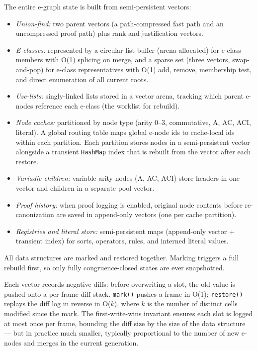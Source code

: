 \documentclass[sigplan,nonacm]{acmart}
\begin{document}
The entire e-graph state is built from semi-persistent vectors:
\begin{itemize}
\item \emph{Union-find:} two parent vectors (a path-compressed fast
  path and an uncompressed proof path) plus rank and justification
  vectors.
\item \emph{E-classes:} represented by a circular list buffer
  (arena-allocated) for e-class members with O(1) splicing on merge,
  and a sparse set (three vectors, swap-and-pop) for e-class
  representatives with O(1) add, remove, membership test, and direct
  enumeration of all current roots.
\item \emph{Use-lists:} singly-linked lists stored in a vector arena,
  tracking which parent e-nodes reference each e-class (the worklist
  for rebuild).
\item \emph{Node caches:} partitioned by node type (arity 0--3,
  commutative, A, AC, ACI, literal).  A global routing table maps
  global e-node ids to cache-local ids within each partition.  Each
  partition stores nodes in a semi-persistent vector alongside a
  transient \texttt{HashMap} index that is rebuilt from the vector
  after each restore.
\item \emph{Variadic children:} variable-arity nodes (A, AC, ACI)
  store headers in one vector and children in a separate pool vector.
\item \emph{Proof history:} when proof logging is enabled, original
  node contents before re-canonization are saved in append-only
  vectors (one per cache partition).
\item \emph{Registries and literal store:} semi-persistent maps
  (append-only vector + transient index) for sorts, operators, rules,
  and interned literal values.
\end{itemize}

All data structures are marked and restored together.  Marking
triggers a full rebuild first, so only fully congruence-closed states
are ever snapshotted.

Each vector records negative diffs: before overwriting a slot, the
old value is pushed onto a per-frame diff stack.  \texttt{mark()}
pushes a frame in O(1); \texttt{restore()} replays the diff log in
reverse in O($k$), where $k$ is the number of distinct cells
modified since the mark.  The first-write-wins invariant ensures each
slot is logged at most once per frame, bounding the diff size by the
size of the data structure --- but in practice much smaller,
typically proportional to the number of new e-nodes and merges in the
current generation.
\end{document}
